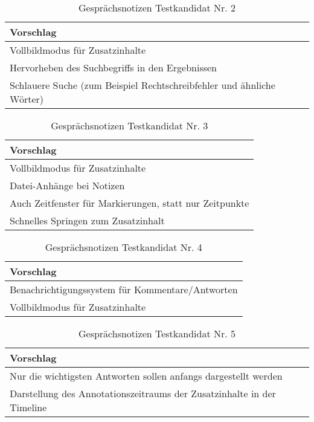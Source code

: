 \begin{table}[!ht]
\centering
\def\arraystretch{1.4}
\begin{tabularx}{\textwidth}{l}      
    \hline
	Vorschlag
	\\\hline
	Vollbildmodus für Zusatzinhalte \\
	Hervorheben des Suchbegriffs in den Ergebnissen \\
	\glqq Schlauere Suche\grqq{} (zum Beispiel Rechtschreibfehler und ähnliche Wörter)\\
    \hline
    \end{tabularx}
    \caption{Gesprächsnotizen Testkandidat Nr. 2}
\label{tab:gesprächsnotizen2}
\end{table}

\begin{table}[!ht]
\centering
\def\arraystretch{1.4}
\begin{tabularx}{\textwidth}{l}      
    \hline
	Vorschlag
	\\\hline
	Vollbildmodus für Zusatzinhalte \\
	Datei-Anhänge bei Notizen \\
	Auch Zeitfenster für Markierungen, statt nur Zeitpunkte \\
	Schnelles Springen zum Zusatzinhalt \\
    \hline
    \end{tabularx}
    \caption{Gesprächsnotizen Testkandidat Nr. 3}
\label{tab:gesprächsnotizen3}
\end{table}

\begin{table}[!ht]
\centering
\def\arraystretch{1.4}
\begin{tabularx}{\textwidth}{l}      
    \hline
	Vorschlag
	\\\hline
	Benachrichtigungssystem für Kommentare/Antworten \\
	Vollbildmodus für Zusatzinhalte \\
    \hline
    \end{tabularx}
    \caption{Gesprächsnotizen Testkandidat Nr. 4}
\label{tab:gesprächsnotizen4}
\end{table}

\begin{table}[!ht]
\centering
\def\arraystretch{1.4}
\begin{tabularx}{\textwidth}{l}      
    \hline
	Vorschlag
	\\\hline
	Nur die wichtigsten Antworten sollen anfangs dargestellt werden \\
	Darstellung des Annotationszeitraums der Zusatzinhalte in der Timeline \\
    \hline
    \end{tabularx}
    \caption{Gesprächsnotizen Testkandidat Nr. 5}
\label{tab:gesprächsnotizen5}
\end{table}

